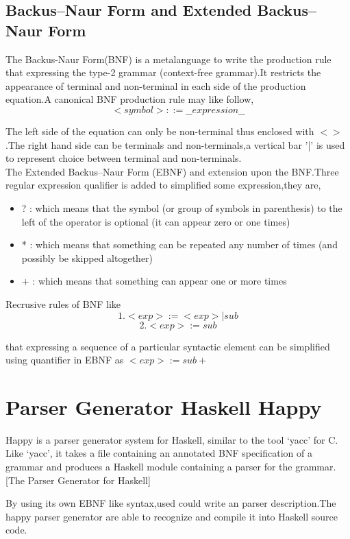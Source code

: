 \subsection {Backus–Naur Form and Extended Backus–Naur Form}
The Backus-Naur Form(BNF) is a metalanguage to write the production rule that expressing the type-2 grammar (context-free grammar).It  restricts the appearance of terminal and non-terminal in each side of the production equation.A canonical BNF production rule may like follow,
 \[   <symbol> ::= \_\_expression\_\_ \]
 
The left side of the equation can only be non-terminal thus enclosed with $<>$ .The right hand side can be terminals and non-terminals,a vertical bar '|' is used to represent choice between terminal and non-terminals.\\

The  Extended Backus–Naur Form (EBNF) and extension upon the BNF.Three regular expression qualifier is added to simplified some expression,they are,
\begin{itemize}
\item ? : which means that the symbol (or group of symbols in parenthesis) to the left of the operator is
optional (it can appear zero or one times)
\item * : which means that something can be repeated any number of times (and possibly be skipped
altogether)
\item + : which means that something can appear one or more times 
\end{itemize} \cite{book}

Recrusive rules of BNF  like 
\[   1. <exp> := <exp> | sub \]
\[	 2. <exp> := sub     \]
 
that expressing a sequence of a particular syntactic element can be simplified using quantifier in EBNF as $ <exp>:=sub+ $



\section{Parser Generator Haskell Happy}
Happy is a parser generator system for Haskell, similar to the tool `yacc' for C. Like `yacc', it takes a file containing an annotated BNF specification of a grammar and produces a Haskell module containing a parser for the grammar.
[The Parser Generator for Haskell] 

By using its own EBNF like syntax,used could write an parser description.The happy parser generator are able to recognize and compile it into Haskell source code.


